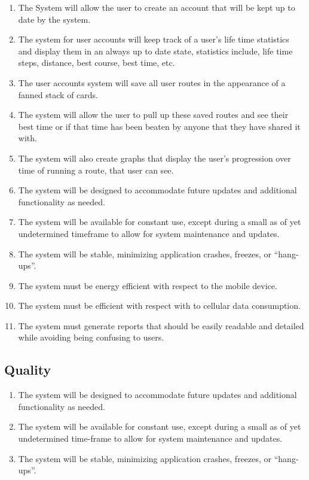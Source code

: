 ﻿\documentclass{article}
\begin{document}
\begin{enumerate}
    \item The System will allow the user to create an account that will be kept up to date by the system.
    \item The system for user accounts will keep track of a user's life time statistics and display them in an always up to date state, statistics include, life time steps, distance, best course, best time, etc.
    \item The user accounts system will save all user routes in the appearance of a fanned stack of cards.
    \item The system will allow the user to pull up these saved routes and see their best time or if that time has been beaten by anyone that they have shared it with.
    \item The system will also create graphs that display the user’s progression over time of running a route, that user can see.
    \item The system will be designed to accommodate future updates and additional functionality as needed.
    \item The system will be available for constant use, except during a small as of yet undetermined timeframe to allow for system maintenance and updates.
    \item The system will be stable, minimizing application crashes, freezes, or “hang-ups”.
    \item The system must be energy efficient with respect to the mobile device.
    \item The system must be efficient with respect with to cellular data consumption.
    \item The system must generate reports that should be easily readable and detailed while avoiding being confusing to users.




\end{enumerate}
\subsection{Quality}
\begin{enumerate}
    \item The system will be designed to accommodate future updates and additional functionality as needed.
    \item The system will be available for constant use, except during a small as of yet undetermined time-frame to allow for system maintenance and updates.
    \item The system will be stable, minimizing application crashes, freezes, or “hang-ups”.
\end{enumerate}
\end{document}
